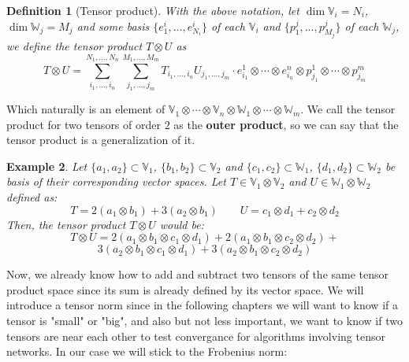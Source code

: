 \documentclass[11pt,a4paper,openright,oneside]{book}
\numberwithin{equation}{section}
\newtheorem{defn0}{Definition}[chapter]
\newtheorem{example0}[defn0]{Example}
\newenvironment{definition}{ \begin{defn0}}{\end{defn0}}
\newenvironment{example}{ \begin{example0}\rm}{\end{example0}}
\begin{document}
\begin{definition}[Tensor product] With the above notation, let $\dim \mathbb{V}_i = N_i$, $\dim \mathbb{W}_j = M_j$
    and some basis $\{e_1^i, \dots, e_{N_i}^i\}$ of each $\mathbb{V}_i$ and $\{p_1^j, \dots, p_{M_j}^j\}$ of each $\mathbb{W}_j$,
    we define the tensor product
    $T \otimes U$ as
    \begin{equation}
        T \otimes U = \sum_{i_1, \dots, i_n}^{N_1, \dots, N_n} \sum_{j_1, \dots, j_m}^{M_1, \dots, M_m} T_{i_1, \dots, i_n} U_{j_1, \dots, j_m} \cdot
    e_{i_1}^1 \otimes \cdots \otimes e_{i_n}^n \otimes p_{j_1}^1 \otimes \cdots \otimes p_{j_m}^m
    \label{eq:tensor_product}
\end{equation}
\end{definition}

Which naturally is an element of $\mathbb{V}_1 \otimes \cdots \otimes \mathbb{V}_n \otimes \mathbb{W}_1 \otimes \cdots \otimes \mathbb{W}_m$.
We call the tensor product for two tensors of order $2$ as the \textbf{outer product}, so we can say that 
the tensor product is a generalization of it.

\begin{example}
    Let $\{a_1, a_2\} \subset \mathbb{V}_1$, $\{b_1, b_2\} \subset \mathbb{V}_2$ and $\{c_1, c_2\} \subset \mathbb{W}_1$, $\{d_1, d_2\} \subset \mathbb{W}_2$ be basis
    of their corresponding vector spaces. Let $T \in \mathbb{V}_1 \otimes \mathbb{V}_2$ and $U \in \mathbb{W}_1 \otimes \mathbb{W}_2$ defined as:
    $$T = 2 (a_1 \otimes b_1) + 3 (a_2 \otimes b_1) \qquad U = c_1 \otimes d_1 + c_2 \otimes d_2$$
    Then, the tensor product $T \otimes U$ would be:
    $$T \otimes U = 2 (a_1 \otimes b_1 \otimes c_1 \otimes d_1) + 2 (a_1 \otimes b_1 \otimes c_2 \otimes d_2) + $$$$
    3 (a_2 \otimes b_1 \otimes c_1 \otimes d_1) + 3 (a_2 \otimes b_1 \otimes c_2 \otimes d_2)$$
\end{example}

Now, we already know how to add and subtract two tensors of the same tensor product space since its sum is already
defined by its vector space. We will introduce a tensor norm since in the following chapters we will want to know if
a tensor is "small" or "big", and also but not less important, we want to know if two tensors are near each other
to test convergance for algorithms involving tensor networks. In our case we will stick to the Frobenius norm:
\end{document}
